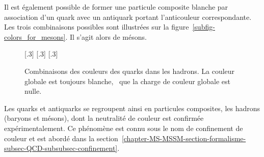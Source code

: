 Il est également possible de former une particule composite blanche par association d'un quark avec un antiquark portant l'anticouleur correspondante. Les trois combinaisons possibles sont illustrées sur la figure~\ref{subfig-colors_for_mesons}. Il s'agit alors de mésons.
\begin{figure}[b]
\centering
{}[.3\textwidth]
{}
\hfill
{}[.3\textwidth]
{}
\hfill
{}[.3\textwidth]
{}
\caption{Combinaisons des couleurs des quarks dans les hadrons. La couleur globale est toujours blanche, \ie\ que la charge de couleur globale est nulle.}
\label{fig-colors_for_hadrons}
\end{figure}
\par Les quarks et antiquarks se regroupent ainsi en particules composites, les hadrons (baryons et mésons), dont la neutralité de couleur est confirmée expérimentalement. Ce phénomène est connu sous le nom de \og confinement de couleur \fg{} et est abordé dans la section~\ref{chapter-MS-MSSM-section-formalisme-subsec-QCD-subsubsec-confinement}.

